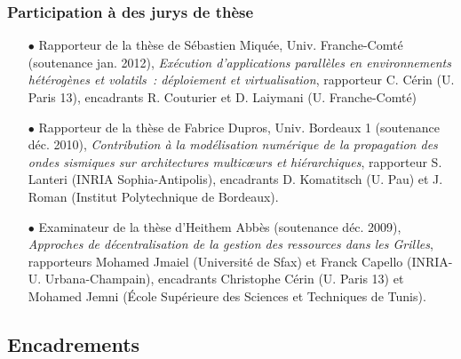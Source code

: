 \documentclass[11pt]{article}
\begin{document}
\subsubsection{Participation à des jurys de thèse}

\begin{itemize}

\item[$\bullet$] 
Rapporteur de la thèse de Sébastien Miquée, Univ. Franche-Comté (soutenance 
jan. 2012), \textit{Exécution d'applications parallèles en environnements 
hétérogènes et volatils~: déploiement et virtualisation},
rapporteur C. Cérin (U. Paris 13), 
encadrants R. Couturier et D. Laiymani (U. Franche-Comté)\\

\item[$\bullet$] 
Rapporteur de la thèse de Fabrice Dupros, Univ. Bordeaux 1 (soutenance déc. 2010), 
\textit{Contribution à la modélisation numérique de la propagation des ondes 
sismiques sur architectures multic{\oe}urs et hiérarchiques},
rapporteur S. Lanteri (INRIA Sophia-Antipolis), 
encadrants D. Komatitsch (U. Pau) et J. Roman (Institut Polytechnique de 
Bordeaux).\\

\item[$\bullet$] 
Examinateur de la thèse d'Heithem Abbès (soutenance déc. 2009), 
\textit{Approches de décentralisation de la gestion des ressources dans les 
Grilles}, rapporteurs Mohamed Jmaiel (Université de Sfax) et Franck Capello 
(INRIA-U. Urbana-Champain), encadrants Christophe Cérin (U. Paris 13) et 
Mohamed Jemni (École Supérieure des Sciences et Techniques de Tunis).
\end{itemize}




\subsection{Encadrements}
\end{document}
